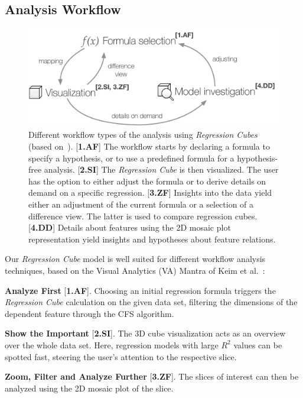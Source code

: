 \documentclass[journal]{style/vgtc} 			          %
\begin{document}
\subsection{Analysis Workflow} \label{sec:Workflow}
\begin{figure}[htb]
 \centering
 \includegraphics[width=1.0\linewidth]{figures/workflow}
 \caption{
 Different workflow types of the analysis using \emph{Regression Cubes} (based on~\cite{Keim}).
 [\textbf{1.AF}] The workflow starts by declaring a formula to specify a hypothesis, or to use a predefined formula for a hypothesis-free analysis.
 [\textbf{2.SI}] The \emph{Regression Cube} is then visualized.
 The user has the option to either adjust the formula or to derive details on demand on a specific regression.
 [\textbf{3.ZF}] Insights into the data yield either an adjustment of the current formula or a selection of a difference view.
 The latter is used to compare regression cubes.
 [\textbf{4.DD}] Details about features using the 2D mosaic plot representation yield insights and hypotheses about feature relations.
 }
  \label{fig:Workflow}
\end{figure}
\noindent Our \emph{Regression Cube} model is well suited for different workflow analysis techniques, based on the Visual Analytics (VA) Mantra of Keim et al.~\cite{Keim}:

\textbf{Analyze First} [\textbf{1.AF}]. Choosing an initial regression formula triggers the \emph{Regression Cube} calculation on the given data set, filtering the dimensions of the dependent feature through the CFS algorithm.

\textbf{Show the Important} [\textbf{2.SI}]. The 3D cube visualization acts as an overview over the whole data set.
Here, regression models with large $R^2$ values can be spotted fast, steering the user's attention to the respective slice.

\textbf{Zoom, Filter and Analyze Further} [\textbf{3.ZF}]. The slices of interest can then be analyzed using the 2D mosaic plot of the slice.
\end{document}
